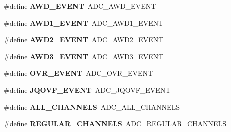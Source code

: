\begin{DoxyCompactItemize}
\#define {\bfseries A\+W\+D\+\_\+\+E\+V\+E\+NT}~A\+D\+C\+\_\+\+A\+W\+D\+\_\+\+E\+V\+E\+NT
\item 
\mbox{\label{group___h_a_l___a_d_c___aliased___defines_ga1429af679941d537c64f7004430fdf54}} 
\#define {\bfseries A\+W\+D1\+\_\+\+E\+V\+E\+NT}~A\+D\+C\+\_\+\+A\+W\+D1\+\_\+\+E\+V\+E\+NT
\item 
\mbox{\label{group___h_a_l___a_d_c___aliased___defines_ga04d97e3fb4776a8fae622cf88b442687}} 
\#define {\bfseries A\+W\+D2\+\_\+\+E\+V\+E\+NT}~A\+D\+C\+\_\+\+A\+W\+D2\+\_\+\+E\+V\+E\+NT
\item 
\mbox{\label{group___h_a_l___a_d_c___aliased___defines_gabb3f690eef894c37c3f2c49e1d8c6c06}} 
\#define {\bfseries A\+W\+D3\+\_\+\+E\+V\+E\+NT}~A\+D\+C\+\_\+\+A\+W\+D3\+\_\+\+E\+V\+E\+NT
\item 
\mbox{\label{group___h_a_l___a_d_c___aliased___defines_gaf63a166dce844ba44197109fe3a3d02f}} 
\#define {\bfseries O\+V\+R\+\_\+\+E\+V\+E\+NT}~A\+D\+C\+\_\+\+O\+V\+R\+\_\+\+E\+V\+E\+NT
\item 
\mbox{\label{group___h_a_l___a_d_c___aliased___defines_gae63ff704e73ca97890da8a07e141bb96}} 
\#define {\bfseries J\+Q\+O\+V\+F\+\_\+\+E\+V\+E\+NT}~A\+D\+C\+\_\+\+J\+Q\+O\+V\+F\+\_\+\+E\+V\+E\+NT
\item 
\mbox{\label{group___h_a_l___a_d_c___aliased___defines_gac9dcdba2096f6b3adab742b8b1a256c2}} 
\#define {\bfseries A\+L\+L\+\_\+\+C\+H\+A\+N\+N\+E\+LS}~A\+D\+C\+\_\+\+A\+L\+L\+\_\+\+C\+H\+A\+N\+N\+E\+LS
\item 
\mbox{\label{group___h_a_l___a_d_c___aliased___defines_ga9480bc25f45fc189111dba13103c404e}} 
\#define {\bfseries R\+E\+G\+U\+L\+A\+R\+\_\+\+C\+H\+A\+N\+N\+E\+LS}~\mbox{\hyperlink{group___a_d_c__channels__type_gad47a927eded315f3dcb21df51ff778fd}{A\+D\+C\+\_\+\+R\+E\+G\+U\+L\+A\+R\+\_\+\+C\+H\+A\+N\+N\+E\+LS}}
\item 
\mbox{\label{group___h_a_l___a_d_c___aliased___defines_ga458eefd477e1e06e313716de162b7d0f}} 

\end{DoxyCompactItemize}
